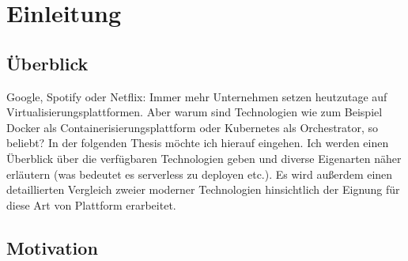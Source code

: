 \chapter{Einleitung \checkmark}

\section{\"Uberblick \checkmark}

Google, Spotify oder Netflix: Immer mehr Unternehmen setzen heutzutage auf Virtualisierungsplattformen. Aber warum sind Technologien wie zum Beispiel Docker als Containerisierungsplattform oder Kubernetes als Orchestrator, so beliebt? In der folgenden Thesis möchte ich hierauf eingehen. Ich werden einen Überblick über die verfügbaren Technologien geben und diverse Eigenarten näher erläutern (was bedeutet es serverless zu deployen etc.). Es wird außerdem einen detaillierten Vergleich zweier moderner Technologien hinsichtlich der Eignung für diese Art von Plattform erarbeitet.


\section{Motivation \checkmark}

